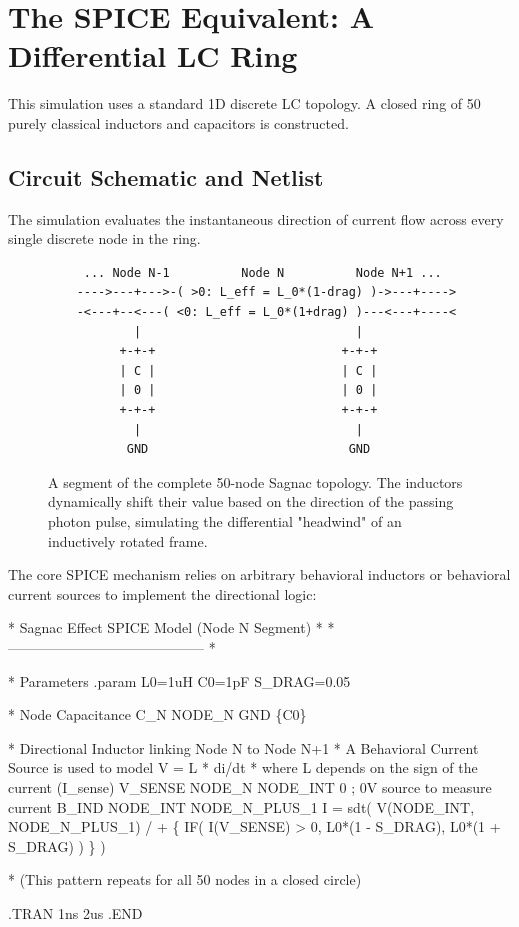 \section{The SPICE Equivalent: A Differential LC Ring}
This simulation uses a standard 1D discrete LC topology. A closed ring of 50 purely classical inductors and capacitors is constructed.

\subsection{Circuit Schematic and Netlist}
The simulation evaluates the instantaneous direction of current flow across every single discrete node in the ring. 

\begin{figure}[h!]
    \centering
    \begin{tcolorbox}[colback=black!5!white, colframe=black!75!white, title=Simplified LTspice Equivalent Circuit (Sagnac Ring Segment)]
    \centering
    \begin{verbatim}
     ... Node N-1          Node N          Node N+1 ...
    ---->---+--->-( >0: L_eff = L_0*(1-drag) )->---+---->
    -<---+--<---( <0: L_eff = L_0*(1+drag) )---<---+----<
            |                              |
          +-+-+                          +-+-+
          | C |                          | C |
          | 0 |                          | 0 |
          +-+-+                          +-+-+
            |                              |
           GND                            GND
    \end{verbatim}
    \end{tcolorbox}
    \caption{A segment of the complete 50-node Sagnac topology. The inductors dynamically shift their value based on the direction of the passing photon pulse, simulating the differential "headwind" of an inductively rotated frame.}
\end{figure}

The core SPICE mechanism relies on arbitrary behavioral inductors or behavioral current sources to implement the directional logic:

\begin{tcolorbox}[colback=black!95!white, coltext=white, fontupper=\ttfamily, title=SPICE Netlist: Sagnac Inductive Drag (sagnac\_ring.cir) - Single Node]
* Sagnac Effect SPICE Model (Node N Segment) *
* ------------------------------------------ *

* Parameters
.param L0=1uH C0=1pF S\_DRAG=0.05

* Node Capacitance
C\_N NODE\_N GND \{C0\}

* Directional Inductor linking Node N to Node N+1
* A Behavioral Current Source is used to model V = L * di/dt
* where L depends on the sign of the current (I\_sense)
V\_SENSE NODE\_N NODE\_INT 0  ; 0V source to measure current
B\_IND NODE\_INT NODE\_N\_PLUS\_1 I = sdt( V(NODE\_INT, NODE\_N\_PLUS\_1) / 
+ \{ IF( I(V\_SENSE) > 0, L0*(1 - S\_DRAG), L0*(1 + S\_DRAG) ) \} )

* (This pattern repeats for all 50 nodes in a closed circle)

.TRAN 1ns 2us
.END
\end{tcolorbox}

